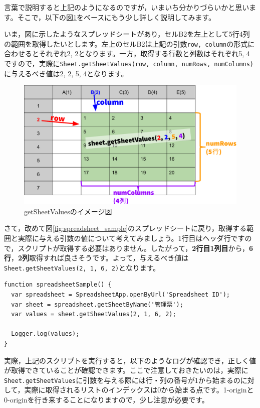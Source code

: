 \documentclass[uplatex,a4j]{jsarticle}
\begin{document}
言葉で説明すると上記のようになるのですが，いまいち分かりづらいかと思います。そこで，以下の図\ref{fig:getsheetvalues_image}をベースにもう少し詳しく説明してみます。


いま，図に示したようなスプレッドシートがあり，セルB2を左上として5行4列の範囲を取得したいとします。左上のセルB2は上記の引数\verb|row, column|の形式に合わせるとそれぞれ2, 2となります。一方，取得する行数と列数はそれぞれ5, 4ですので，実際に\verb|Sheet.getSheetValues(row, column, numRows, numColumns)|に与えるべき値は2, 2, 5, 4となります。

\begin{figure}[H]
 \centering
 \includegraphics[keepaspectratio, scale=0.7]{images/getsheetvalues_image.pdf}
 \caption{getSheetValuesのイメージ図}
 \label{fig:getsheetvalues_image}
\end{figure}

さて，改めて図\ref{fig:spreadsheet_sample}のスプレッドシートに戻り，取得する範囲と実際に与える引数の値について考えてみましょう。1行目はヘッダ行ですので，スクリプトが取得する必要はありません。したがって，\textbf{2行目1列目}から，\textbf{6行}，\textbf{2列}取得すれば良さそうです。よって，与えるべき値は\verb|Sheet.getSheetValues(2, 1, 6, 2)|となります。

\begin{lstlisting}[basicstyle=\ttfamily\footnotesize,frame=single,caption=SpreadsheetApp sample 4]
function spreadsheetSample() {
  var spreadsheet = SpreadsheetApp.openByUrl('Spreadsheet ID');
  var sheet = spreadsheet.getSheetByName('管理票');
  var values = sheet.getSheetValues(2, 1, 6, 2);
  
  Logger.log(values);
}
\end{lstlisting}

実際，上記のスクリプトを実行すると，以下のようなログが確認でき，正しく値が取得できていることが確認できます。ここで注意しておきたいのは，実際に\verb|Sheet.getSheetValues|に引数を与える際には行・列の番号が1から始まるのに対して，実際に取得されるリストのインデックスは0から始まる点です。1-originと0-originを行き来することになりますので，少し注意が必要です。
\end{document}
